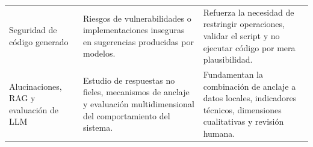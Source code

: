 {\begin{longtable}{>{\raggedright\arraybackslash}p{3.1cm}>{\raggedright\arraybackslash}p{4.45cm}>{\raggedright\arraybackslash}p{6.0cm}}
Seguridad de c\'odigo generado \cite{pearce2022asleep} & Riesgos de vulnerabilidades o implementaciones inseguras en sugerencias producidas por modelos. & Refuerza la necesidad de restringir operaciones, validar el script y no ejecutar c\'odigo por mera plausibilidad. \\
Alucinaciones, RAG y evaluaci\'on de LLM \cite{ji2022hallucination,lewis2020rag,liang2022helm,peng2024usefuleval,liu2023geval} & Estudio de respuestas no fieles, mecanismos de anclaje y evaluaci\'on multidimensional del comportamiento del sistema. & Fundamentan la combinaci\'on de anclaje a datos locales, indicadores t\'ecnicos, dimensiones cualitativas y revisi\'on humana. \\
\bottomrule
\end{longtable}
}